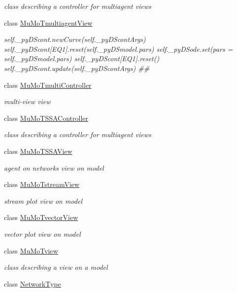 \begin{DoxyCompactItemize}
\begin{DoxyCompactList}\small\item\em class describing a controller for multiagent views \end{DoxyCompactList}\item 
class \hyperlink{class_mu_mo_t_1_1_mu_mo_tmultiagent_view}{Mu\+Mo\+Tmultiagent\+View}
\begin{DoxyCompactList}\small\item\em self.\+\_\+py\+D\+Scont.\+new\+Curve(self.\+\_\+py\+D\+Scont\+Args) self.\+\_\+py\+D\+Scont\mbox{[}\textquotesingle{}E\+Q1\textquotesingle{}\mbox{]}.reset(self.\+\_\+py\+D\+Smodel.\+pars) self.\+\_\+py\+D\+Sode.\+set(pars = self.\+\_\+py\+D\+Smodel.\+pars) self.\+\_\+py\+D\+Scont\mbox{[}\textquotesingle{}E\+Q1\textquotesingle{}\mbox{]}.reset() self.\+\_\+py\+D\+Scont.\+update(self.\+\_\+py\+D\+Scont\+Args) \#\# \end{DoxyCompactList}\item 
class \hyperlink{class_mu_mo_t_1_1_mu_mo_tmulti_controller}{Mu\+Mo\+Tmulti\+Controller}
\begin{DoxyCompactList}\small\item\em multi-\/view view \end{DoxyCompactList}\item 
class \hyperlink{class_mu_mo_t_1_1_mu_mo_t_s_s_a_controller}{Mu\+Mo\+T\+S\+S\+A\+Controller}
\begin{DoxyCompactList}\small\item\em class describing a controller for multiagent views \end{DoxyCompactList}\item 
class \hyperlink{class_mu_mo_t_1_1_mu_mo_t_s_s_a_view}{Mu\+Mo\+T\+S\+S\+A\+View}
\begin{DoxyCompactList}\small\item\em agent on networks view on model \end{DoxyCompactList}\item 
class \hyperlink{class_mu_mo_t_1_1_mu_mo_tstream_view}{Mu\+Mo\+Tstream\+View}
\begin{DoxyCompactList}\small\item\em stream plot view on model \end{DoxyCompactList}\item 
class \hyperlink{class_mu_mo_t_1_1_mu_mo_tvector_view}{Mu\+Mo\+Tvector\+View}
\begin{DoxyCompactList}\small\item\em vector plot view on model \end{DoxyCompactList}\item 
class \hyperlink{class_mu_mo_t_1_1_mu_mo_tview}{Mu\+Mo\+Tview}
\begin{DoxyCompactList}\small\item\em class describing a view on a model \end{DoxyCompactList}\item 
class \hyperlink{class_mu_mo_t_1_1_network_type}{Network\+Type}
\end{DoxyCompactItemize}
